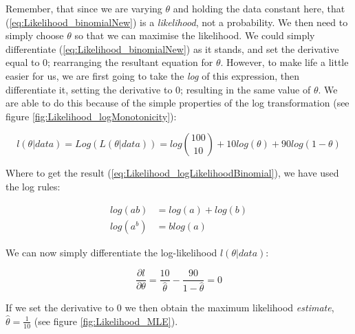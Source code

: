 \documentclass[11pt,fullpage]{book}
\begin{document}
Remember, that since we are varying $\theta$ and holding the data constant here, that (\ref{eq:Likelihood_binomialNew}) is a \textit{likelihood}, not a probability. We then need to simply choose $\theta$ so that we can maximise the likelihood. We could simply differentiate (\ref{eq:Likelihood_binomialNew}) as it stands, and set the derivative equal to 0; rearranging the resultant equation for $\theta$. However, to make life a little easier for us, we are first going to take the \textit{log} of this expression, then differentiate it, setting the derivative to 0; resulting in the same value of $\theta$. We are able to do this because of the simple properties of the log transformation (see figure \ref{fig:Likelihood_logMonotonicity}):

\begin{equation}\label{eq:Likelihood_logLikelihoodBinomial}
l(\theta|data) = Log \left(L(\theta|data)\right) = log{100 \choose 10}+ 10log(\theta)+ 90 log(1-\theta)
\end{equation}

Where to get the result (\ref{eq:Likelihood_logLikelihoodBinomial}), we have used the log rules:

\begin{equation}\label{eq:Likelihood_logRules}
\begin{align}
log(ab) &= log(a) + log(b)\\
log(a^b) &= blog(a)
\end{align}
\end{equation}

We can now simply differentiate the log-likelihood $l(\theta|data)$:

\begin{equation}\label{eq:Likelihood_binomialderiv}
\frac{\partial l}{\partial \theta} = \frac{10}{\hat{\theta}}-\frac{90}{1-\hat{\theta}} = 0
\end{equation}

If we set the derivative to 0 we then obtain the maximum likelihood \textit{estimate}, $\hat{\theta} = \frac{1}{10}$ (see figure \ref{fig:Likelihood_MLE}).
\end{document}
